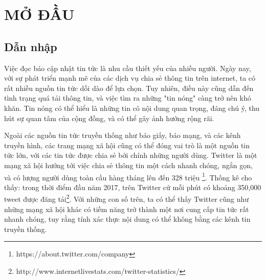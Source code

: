 \chapter{MỞ ĐẦU}
\ifpdf
    \graphicspath{{Chapter1/Chapter1Figs/PNG/}{Chapter1/Chapter1Figs/PDF/}{Chapter1/Chapter1Figs/}}
\else
    \graphicspath{{Chapter1/Chapter1Figs/EPS/}{Chapter1/Chapter1Figs/}}
\fi

\section{Dẫn nhập}
Việc đọc báo cập nhật tin tức là nhu cầu thiết yếu của nhiều người. Ngày nay, với sự phát triển mạnh mẽ của các dịch vụ chia sẻ thông tin trên internet, ta có rất nhiều nguồn tin tức dồi dào để lựa chọn. Tuy nhiên, điều này cũng dẫn đến tình trạng quá tải thông tin, và việc tìm ra những "tin nóng" càng trở nên khó khăn. Tin nóng có thể hiểu là những tin có nội dung quan trọng, đáng chú ý, thu hút sự quan tâm của cộng đồng, và có thể gây ảnh hưởng rộng rãi. 


Ngoài các nguồn tin tức truyền thống như báo giấy, báo mạng, và các kênh truyền hình, các trang mạng xã hội cũng có thể đóng vai trò là một nguồn tin tức lớn, với các tin tức được chia sẻ bởi chính những người dùng. Twitter là một mạng xã hội hướng tới việc chia sẻ thông tin một cách nhanh chóng, ngắn gọn, và có lượng người dùng toàn cầu hàng tháng lên đến 328 triệu \footnote{https://about.twitter.com/company}. Thống kê cho thấy: trong thời điểm đầu năm 2017, trên Twitter cứ mỗi phút có khoảng 350,000 tweet được đăng tải\footnote{http://www.internetlivestats.com/twitter-statistics/}. Với những con số trên, ta có thể thấy Twitter cũng như những mạng xã hội khác có tiềm năng trở thành một nơi cung cấp tin tức rất nhanh chóng, tuy rằng tính xác thực nội dung có thể không bằng các kênh tin truyền thống. 

